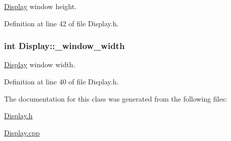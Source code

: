 \hyperlink{classDisplay}{Display} window height. 



Definition at line 42 of file Display.\-h.

\hypertarget{classDisplay_a715bf4b76abf3b8a8cc495cbb7dfd4b0}{
\subsubsection[{\-\_\-window\-\_\-width}]{\setlength{\rightskip}{0pt plus 5cm}int Display\-::\-\_\-window\-\_\-width\hspace{0.3cm}{\ttfamily [private]}}}\label{classDisplay_a715bf4b76abf3b8a8cc495cbb7dfd4b0}


\hyperlink{classDisplay}{Display} window width. 



Definition at line 40 of file Display.\-h.



The documentation for this class was generated from the following files\-:\begin{DoxyCompactItemize}
\item 
\hyperlink{Display_8h}{Display.\-h}\item 
\hyperlink{Display_8cpp}{Display.\-cpp}\end{DoxyCompactItemize}
